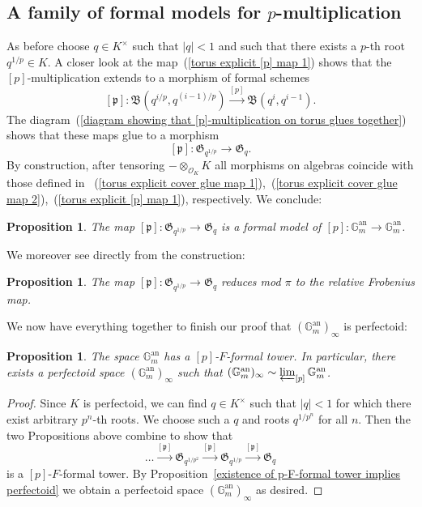\documentclass[10pt,oneside]{amsart}
\newtheorem{proposition}[theorem]{Proposition}
\theoremstyle{definition}
\begin{document}
	\subsection{A family of formal models for $p$-multiplication}
	As before choose $q\in K^\times$ such that $|q|<1$ and such that there exists a $p$-th root $q^{1/p} \in K$. A closer look at the map~(\ref{torus explicit [p] map 1}) shows that the $[p]$-multiplication extends to a morphism of formal schemes
	\[[\mathfrak p]: \mathfrak B(q^{i/p},q^{(i-1)/p})\xrightarrow{[p]} \mathfrak B(q^i,q^{i-1}).\]
	The diagram~(\ref{diagram showing that [p]-multiplication on torus glues together}) shows that these maps glue to a morphism
	\[[\mathfrak p]: \mathfrak G_{q^{1/p}}\rightarrow  \mathfrak G_q.\]
	By construction, after tensoring $-\otimes_{\mathcal O_K} K$ all morphisms on algebras coincide with those defined in ~(\ref{torus explicit cover glue map 1}),~(\ref{torus explicit cover glue map 2}),~(\ref{torus explicit [p] map 1}), respectively. We conclude:
	\begin{proposition}
		The map $[\mathfrak p]: \mathfrak G_{q^{1/p}}\rightarrow  \mathfrak G_q$ is a formal model of $[p]:\mathbb G_m^{\operatorname{an}}\rightarrow \mathbb G_m^{\operatorname{an}}$.
	\end{proposition}
	We moreover see directly from the construction:
	\begin{proposition}
		The map $[\mathfrak p]: \mathfrak G_{q^{1/p}}\rightarrow  \mathfrak G_q$ reduces mod $\pi$ to the relative Frobenius map.
	\end{proposition}
	We now have everything together to finish our proof that $(\mathbb G_m^{\operatorname{an}})_\infty$ is perfectoid:
	\begin{proposition}
		The space $\mathbb G_m^{\operatorname{an}}$ has a $[p]$-$F$-formal tower. In particular, there exists a perfectoid space $(\mathbb G_m^{\operatorname{an}})_\infty$ such that $(\mathbb G_m^{\operatorname{an}})_\infty \sim \varprojlim_{[p]} \mathbb G_m^{\operatorname{an}}$.
	\end{proposition}
	\begin{proof}
		Since $K$ is perfectoid, we can find $q\in K^\times$ such that $|q|<1$ for which there exist arbitrary $p^n$-th roots. We choose such a $q$ and roots $q^{1/p^n}$ for all $n$. Then the two Propositions above combine to show that 
		\[\dots \xrightarrow{[\mathfrak p]} \mathfrak G_{q^{1/p^2}}\xrightarrow{[\mathfrak p]} \mathfrak G_{q^{1/p}}\xrightarrow{[\mathfrak p]} \mathfrak G_q\]
		is a $[p]$-$F$-formal tower.
		By Proposition~\ref{existence of p-F-formal tower implies perfectoid} we obtain a perfectoid space $(\mathbb G_m^{\operatorname{an}})_\infty$ as desired.
	\end{proof}
	
\end{document}
